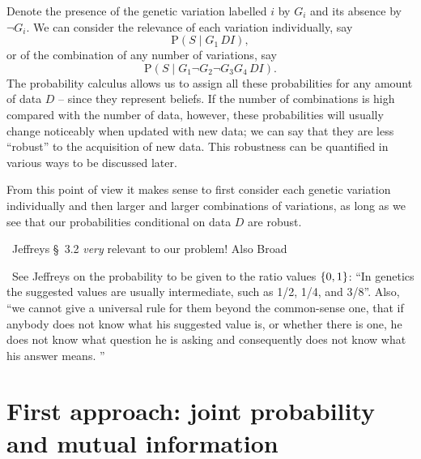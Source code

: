 \documentclass[\ifafour a4paper,12pt,\else a5paper,10pt,\fi%
onecolumn,oneside,article,%
british%
]{memoir}
\theoremstyle{remark}
\theoremstyle{innote}
\newcommand*{\citey}{\parencites*}
\DeclarePairedDelimiter\set{\{}{\}}
\newcommand*{\p}{\mathrm{P}}%
\renewcommand*{\|}{\mathpunct{|}}
\newcommand*{\sect}{\S}%
\newcommand*{\puzzle}{\maltese}
\newcommand{\mynote}[1]{ {\color{notecolour}\puzzle\ #1}}
\newcommand*{\yD}{D}
\newcommand*{\yS}{S}
\newcommand*{\yI}{I}
\newcommand*{\yGv}{G}
\begin{document}
Denote the presence of the genetic variation labelled $i$ by $\yGv_i$ and its
absence by $\lnot\yGv_i$. We can consider the  relevance of each
variation individually, say
\begin{equation}
  \label{eq:example_relevance_onevariation}
  \p(\yS \|\yGv_1 \,\yD \yI),
\end{equation}
or of the combination of any number of variations, say
\begin{equation}
  \label{eq:example_relevance_manyvariations}
  \p(\yS \|\yGv_1 \lnot\yGv_2 \lnot\yGv_3 \yGv_4 \,\yD \yI).
\end{equation}
The probability calculus allows us to assign all these probabilities for
any amount of data $\yD$ -- since they represent beliefs. If the number of
combinations is high compared with the number of data, however, these
probabilities will usually change noticeably when updated with new data; we
can say that they are less \enquote{robust} to the acquisition of new data.
This robustness can be quantified in various ways to be discussed later.

From this point of view it makes sense to first consider each genetic
variation individually and then larger and larger combinations of
variations, as long as we see that our probabilities conditional on data
$\yD$ are robust.


\mynote{Jeffreys \citey{jeffreys1939_r1983} \sect~3.2 \emph{very} relevant
  to our problem! Also Broad \citey{broad1918}}

\mynote{See Jeffreys \citey[\sect~3.1, p.~124]{jeffreys1939_r1983} on the
  probability to be given to the ratio values $\set{0,1}$: \enquote{In
    genetics the suggested values are usually intermediate, such as 1/2,
    1/4, and 3/8}. Also, \enquote{we cannot give a universal rule for them
    beyond the common-sense one, that if anybody does not know what his
    suggested value is, or whether there is one, he does not know what
    question he is asking and consequently does not know what his answer
    means. }}



\section{First approach: joint probability and mutual information}
\label{sec:joint_prob}
\end{document}
